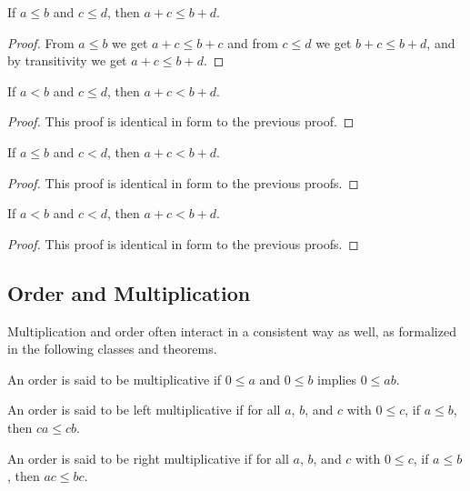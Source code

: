 \documentclass[../../math.tex]{subfiles}
\begin{document}
\begin{theorem} \label{le_lrplus}
    If $a \leq b$ and $c \leq d$, then $a + c \leq b + d$.
\end{theorem}
\begin{proof}
    From $a \leq b$ we get $a + c \leq b + c$ and from $c \leq d$ we get $b + c
    \leq b + d$, and by transitivity we get $a + c \leq b + d$.
\end{proof}

\begin{theorem} \label{lt_le_lrplus}
    If $a < b$ and $c \leq d$, then $a + c < b + d$.
\end{theorem}
\begin{proof}
    This proof is identical in form to the previous proof.
\end{proof}

\begin{theorem} \label{le_lt_lrplus}
    If $a \leq b$ and $c < d$, then $a + c < b + d$.
\end{theorem}
\begin{proof}
    This proof is identical in form to the previous proofs.
\end{proof}

\begin{theorem} \label{lt_lrplus}
    If $a < b$ and $c < d$, then $a + c < b + d$.
\end{theorem}
\begin{proof}
    This proof is identical in form to the previous proofs.
\end{proof}

\subsection{Order and Multiplication}

Multiplication and order often interact in a consistent way as well, as
formalized in the following classes and theorems.

\begin{class}
    An order is said to be multiplicative if $0 \leq a$ and $0 \leq b$ implies
    $0 \leq ab$.
\end{class}

\begin{class}
    An order is said to be left multiplicative if for all $a$, $b$, and $c$ with
    $0 \leq c$, if $a \leq b$, then $ca \leq cb$.
\end{class}

\begin{class}
    An order is said to be right multiplicative if for all $a$, $b$, and $c$
    with $0 \leq c$, if $a \leq b$, then $ac \leq bc$.
\end{class}
\end{document}
